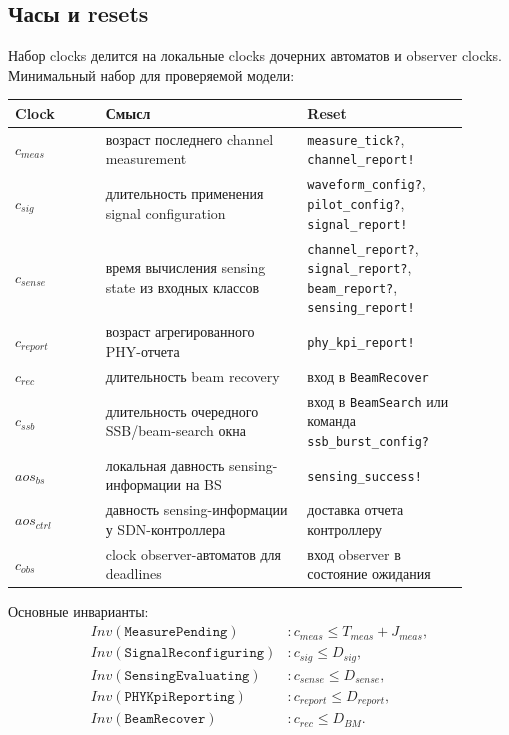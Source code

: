 \documentclass[10pt,a4paper]{article}
\newcommand{\code}[1]{\texttt{#1}}
\begin{document}
\subsection{Часы и resets}

Набор clocks делится на локальные clocks дочерних автоматов и observer clocks. Минимальный набор для проверяемой модели:
\begin{longtable}{|p{0.18\linewidth}|p{0.40\linewidth}|p{0.32\linewidth}|}
\hline
Clock & Смысл & Reset \\
\hline
\(c_{meas}\) & возраст последнего channel measurement & \code{measure\_tick?}, \code{channel\_report!} \\
\hline
\(c_{sig}\) & длительность применения signal configuration & \code{waveform\_config?}, \code{pilot\_config?}, \code{signal\_report!} \\
\hline
\(c_{sense}\) & время вычисления sensing state из входных классов & \code{channel\_report?}, \code{signal\_report?}, \code{beam\_report?}, \code{sensing\_report!} \\
\hline
\(c_{report}\) & возраст агрегированного PHY-отчета & \code{phy\_kpi\_report!} \\
\hline
\(c_{rec}\) & длительность beam recovery & вход в \code{BeamRecover} \\
\hline
\(c_{ssb}\) & длительность очередного SSB/beam-search окна & вход в \code{BeamSearch} или команда \code{ssb\_burst\_config?} \\
\hline
\(aos_{bs}\) & локальная давность sensing-информации на BS & \code{sensing\_success!} \\
\hline
\(aos_{ctrl}\) & давность sensing-информации у SDN-контроллера & доставка отчета контроллеру \\
\hline
\(c_{obs}\) & clock observer-автоматов для deadlines & вход observer в состояние ожидания \\
\hline
\end{longtable}

Основные инварианты:
\begin{align}
Inv(\code{MeasurePending})&: c_{meas}\le T_{meas}+J_{meas},\\
Inv(\code{SignalReconfiguring})&: c_{sig}\le D_{sig},\\
Inv(\code{SensingEvaluating})&: c_{sense}\le D_{sense},\\
Inv(\code{PHYKpiReporting})&: c_{report}\le D_{report},\\
Inv(\code{BeamRecover})&: c_{rec}\le D_{BM}.
\end{align}
\end{document}
